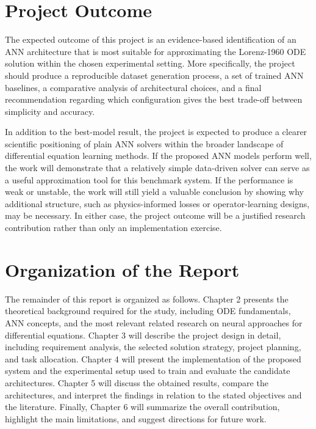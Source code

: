 \section{Project Outcome}
The expected outcome of this project is an evidence-based identification of an ANN architecture that is most suitable for approximating the Lorenz-1960 ODE solution within the chosen experimental setting. More specifically, the project should produce a reproducible dataset generation process, a set of trained ANN baselines, a comparative analysis of architectural choices, and a final recommendation regarding which configuration gives the best trade-off between simplicity and accuracy.

In addition to the best-model result, the project is expected to produce a clearer scientific positioning of plain ANN solvers within the broader landscape of differential equation learning methods. If the proposed ANN models perform well, the work will demonstrate that a relatively simple data-driven solver can serve as a useful approximation tool for this benchmark system. If the performance is weak or unstable, the work will still yield a valuable conclusion by showing why additional structure, such as physics-informed losses or operator-learning designs, may be necessary. In either case, the project outcome will be a justified research contribution rather than only an implementation exercise.

\section{Organization of the Report}
The remainder of this report is organized as follows. Chapter 2 presents the theoretical background required for the study, including ODE fundamentals, ANN concepts, and the most relevant related research on neural approaches for differential equations. Chapter 3 will describe the project design in detail, including requirement analysis, the selected solution strategy, project planning, and task allocation. Chapter 4 will present the implementation of the proposed system and the experimental setup used to train and evaluate the candidate architectures. Chapter 5 will discuss the obtained results, compare the architectures, and interpret the findings in relation to the stated objectives and the literature. Finally, Chapter 6 will summarize the overall contribution, highlight the main limitations, and suggest directions for future work.
